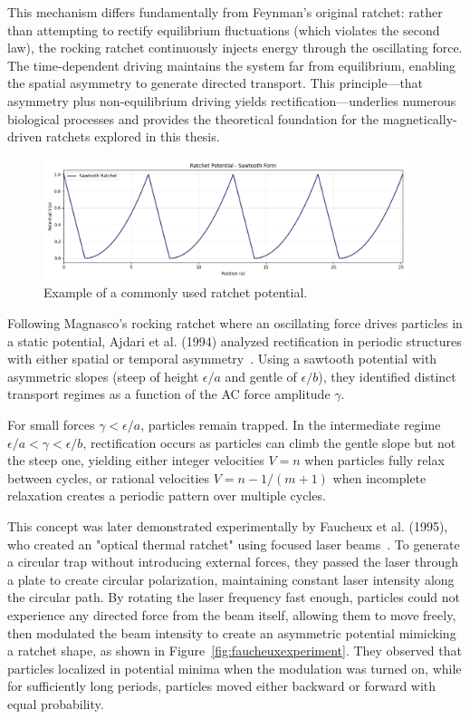 This mechanism differs fundamentally from Feynman's original ratchet: rather than attempting to rectify equilibrium fluctuations (which violates the second law), the rocking ratchet continuously injects energy through the oscillating force. The time-dependent driving maintains the system far from equilibrium, enabling the spatial asymmetry to generate directed transport. This principle—that asymmetry plus non-equilibrium driving yields rectification—underlies numerous biological processes and provides the theoretical foundation for the magnetically-driven ratchets explored in this thesis.

\begin{figure}[h]
  \begin{center}
    \includegraphics[width=0.95\textwidth]{figures/ratchet_potential.png}
  \end{center}
  \caption[Ratchet potential example.]{Example of a commonly used ratchet potential.}\label{fig:}
\end{figure}


Following Magnasco's rocking ratchet where an oscillating force drives particles in a static potential, Ajdari et al. (1994) analyzed rectification in periodic structures with either spatial or temporal asymmetry~\cite{ajdari1994rectified}. Using a sawtooth potential with asymmetric slopes (steep of height $\epsilon/a$ and gentle of $\epsilon/b$), they identified distinct transport regimes as a function of the AC force amplitude $\gamma$. 

For small forces $\gamma < \epsilon/a$, particles remain trapped. In the intermediate regime $\epsilon/a < \gamma < \epsilon/b$, rectification occurs as particles can climb the gentle slope but not the steep one, yielding either integer velocities $V = n$ when particles fully relax between cycles, or rational velocities $V = n - 1/(m+1)$ when incomplete relaxation creates a periodic pattern over multiple cycles.


This concept was later demonstrated experimentally by Faucheux et al. (1995), who created an "optical thermal ratchet" using focused laser beams~\cite{faucheux1995optical}. To generate a circular trap without introducing external forces, they passed the laser through a plate to create circular polarization, maintaining constant laser intensity along the circular path. By rotating the laser frequency fast enough, particles could not experience any directed force from the beam itself, allowing them to move freely, then modulated the beam intensity to create an asymmetric potential mimicking a ratchet shape, as shown in Figure~\ref{fig:faucheuxexperiment}. They observed that particles localized in potential minima when the modulation was turned on, while for sufficiently long periods, particles moved either backward or forward with equal probability.

